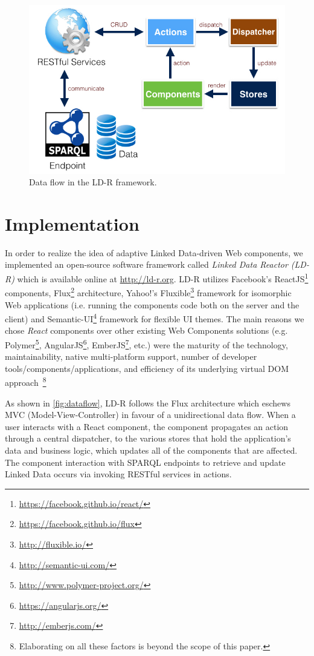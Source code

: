 \documentclass{acm_proc_article-sp}
\begin{document}
\begin{figure}[tb]
  \includegraphics[width=.9\linewidth]{images/dataflow.jpg}
  \caption{Data flow in the LD-R framework.}
  \label{fig:dataflow}
\end{figure}

\section{Implementation}

In order to realize the idea of adaptive Linked Data-driven Web components, we implemented an open-source software framework called \emph{Linked Data Reactor (LD-R)} which is available online at \url{http://ld-r.org}.
LD-R utilizes Facebook's ReactJS\footnote{\url{https://facebook.github.io/react/}} components, Flux\footnote{\url{https://facebook.github.io/flux}} architecture, Yahoo!'s Fluxible\footnote{\url{http://fluxible.io/}} framework for isomorphic Web applications (i.e. running the components code both on the server and the client) and Semantic-UI\footnote{\url{http://semantic-ui.com/}} framework for flexible UI themes.
The main reasons we chose \emph{React} components over other existing Web Components solutions (e.g. Polymer\footnote{\url{http://www.polymer-project.org/}}, AngularJS\footnote{\url{https://angularjs.org/}}, EmberJS\footnote{\url{http://emberjs.com/}}, etc.) were the maturity of the technology, maintainability, native multi-platform support, number of developer tools/components/applications, and efficiency of its underlying virtual DOM approach~\footnote{Elaborating on all these factors is beyond the scope of this paper.}

As shown in \autoref{fig:dataflow}, LD-R follows the Flux architecture which eschews MVC (Model-View-Controller) in favour of a unidirectional data flow. 
When a user interacts with a React component, the component propagates an action through a central dispatcher, to the various stores that hold the application's data and business logic, which updates all of the components that are affected. 
The component interaction with SPARQL endpoints to retrieve and update Linked Data occurs via invoking RESTful services in actions.
\end{document}
